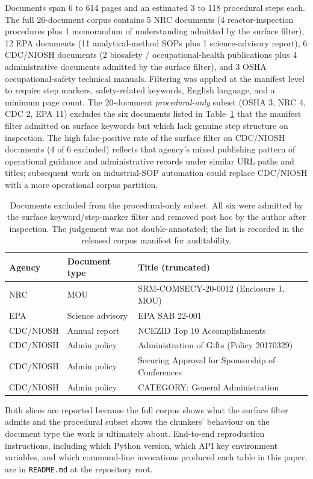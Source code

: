 \documentclass[make,article,submit,oneauthor,pdftex]{Definitions/mdpi}
\begin{document}
Documents span 6 to 614 pages and an estimated 3 to 118 procedural
steps each. The full 26-document corpus contains 5 NRC documents
(4 reactor-inspection procedures plus 1 memorandum of understanding
admitted by the surface filter), 12 EPA documents (11 analytical-method
SOPs plus 1 science-advisory report), 6 CDC/NIOSH documents (2
biosafety / occupational-health publications plus 4 administrative
documents admitted by the surface filter), and 3 OSHA
occupational-safety technical manuals. Filtering was applied at the
manifest level to require step markers, safety-related keywords,
English language, and a minimum page count. The 20-document
\emph{procedural-only} subset (OSHA 3, NRC 4, CDC 2, EPA 11) excludes
the six documents listed in Table~\ref{tab:exclusions} that the
manifest filter admitted on surface keywords but which lack genuine
step structure on inspection. The high false-positive rate of the
surface filter on CDC/NIOSH documents (4 of 6 excluded) reflects that
agency's mixed publishing pattern of operational guidance and
administrative records under similar URL paths and titles; subsequent
work on industrial-SOP automation could replace CDC/NIOSH with a more
operational corpus partition.

\begin{table}[ht]
\centering
\caption{Documents excluded from the procedural-only subset. All six
were admitted by the surface keyword/step-marker filter and removed
post hoc by the author after inspection. The judgement was not
double-annotated; the list is recorded in the released corpus
manifest for auditability.}
\label{tab:exclusions}
\begin{tabular}{lll}
\toprule
Agency & Document type & Title (truncated) \\
\midrule
NRC      & MOU                  & SRM-COMSECY-20-0012 (Enclosure 1, MOU) \\
EPA      & Science advisory     & EPA SAB 22-001 \\
CDC/NIOSH & Annual report       & NCEZID Top 10 Accomplishments \\
CDC/NIOSH & Admin policy        & Administration of Gifts (Policy 20170329) \\
CDC/NIOSH & Admin policy        & Securing Approval for Sponsorship of Conferences \\
CDC/NIOSH & Admin policy        & CATEGORY: General Administration \\
\bottomrule
\end{tabular}
\end{table} Both slices
are reported because the full corpus shows what the surface filter
admits and the procedural subset shows the chunkers' behaviour on the
document type the work is ultimately about. End-to-end reproduction
instructions, including which Python version, which API key
environment variables, and which command-line invocations produced
each table in this paper, are in \texttt{README.md} at the repository
root.
\end{document}
